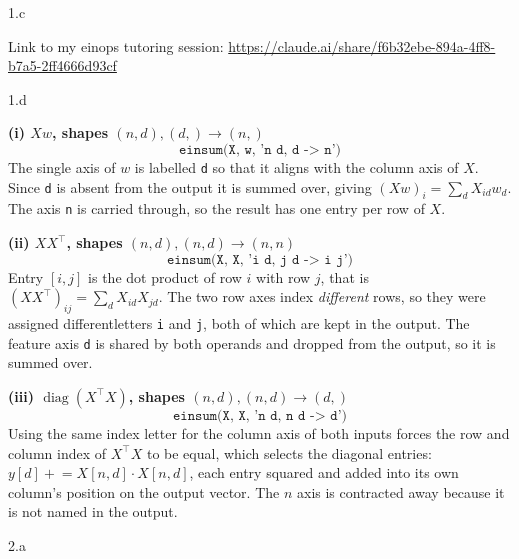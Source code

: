 \LARGE
1.c
\normalsize
\begin{answer}
  Link to my einops tutoring session:
  \url{https://claude.ai/share/f6b32ebe-894a-4ff8-b7a5-2ff4666d93cf}
\end{answer}

\LARGE
1.d
\normalsize
\begin{answer}
  \textbf{(i) $Xw$, shapes $(n,d), (d,) \to (n,)$}
  \[
    \texttt{einsum(X, w, 'n d, d -> n')}
  \]
  The single axis of $w$ is labelled \texttt{d} so that it aligns with the column axis of $X$.
  Since \texttt{d} is absent from the output it is summed over, giving
  $(Xw)_i = \sum_d X_{id} w_d$. The axis \texttt{n} is carried through, so the result has one
  entry per row of $X$.

  \medskip
  \textbf{(ii) $XX^\top$, shapes $(n,d), (n,d) \to (n,n)$}
  \[
    \texttt{einsum(X, X, 'i d, j d -> i j')}
  \]
  Entry $[i,j]$ is the dot product of row $i$ with row $j$, that is
  $(XX^\top)_{ij} = \sum_d X_{id} X_{jd}$. The two row axes index \emph{different} rows, so they were assigned differentletters \texttt{i} and \texttt{j}, both of which are kept in the output.
  The feature axis \texttt{d} is shared by both operands and dropped from the output, so it is
  summed over.

  \medskip
  \textbf{(iii) $\operatorname{diag}(X^\top X)$, shapes $(n,d), (n,d) \to (d,)$}
  \[
    \texttt{einsum(X, X, 'n d, n d -> d')}
  \]
  Using the same index letter for the column axis of both inputs forces the row and column index of $X^\top X$ to be equal, which selects the diagonal entries: $y[d] \mathrel{+}= X[n,d] \cdot X[n,d]$,
  each entry squared and added into its own column's position on the output vector. The $n$ axis is contracted away because it is not named in the output.
 

\end{answer}

\clearpage

\LARGE
2.a
\normalsize

